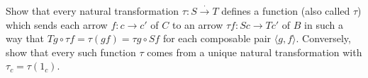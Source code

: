 Show that every natural transformation $\tau: S \xrightarrow{\cdot} T$ defines a function (also called $\tau$) which sends each arrow $f: c \rightarrow c'$ of $C$ to an arrow $\tau f: Sc \rightarrow Tc'$ of $B$ in such a way that $Tg \circ \tau f = \tau(gf) = \tau g \circ Sf$ for each composable pair $\langle g, f\rangle$. Conversely, show that every such function $\tau$ comes from a unique natural transformation with $\tau_c = \tau(1_c)$.